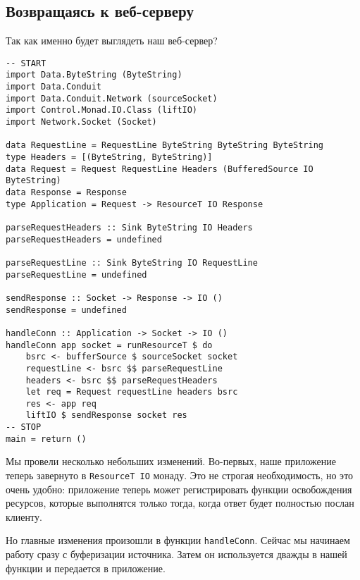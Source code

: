 \subsection{Возвращаясь к веб-серверу}
Так как именно будет выглядеть наш веб-сервер?
\begin{lstlisting}
-- START
import Data.ByteString (ByteString)
import Data.Conduit
import Data.Conduit.Network (sourceSocket)
import Control.Monad.IO.Class (liftIO)
import Network.Socket (Socket)

data RequestLine = RequestLine ByteString ByteString ByteString
type Headers = [(ByteString, ByteString)]
data Request = Request RequestLine Headers (BufferedSource IO ByteString)
data Response = Response
type Application = Request -> ResourceT IO Response

parseRequestHeaders :: Sink ByteString IO Headers
parseRequestHeaders = undefined

parseRequestLine :: Sink ByteString IO RequestLine
parseRequestLine = undefined

sendResponse :: Socket -> Response -> IO ()
sendResponse = undefined

handleConn :: Application -> Socket -> IO ()
handleConn app socket = runResourceT $ do
    bsrc <- bufferSource $ sourceSocket socket
    requestLine <- bsrc $$ parseRequestLine
    headers <- bsrc $$ parseRequestHeaders
    let req = Request requestLine headers bsrc
    res <- app req
    liftIO $ sendResponse socket res
-- STOP
main = return ()
\end{lstlisting}
Мы провели несколько небольших изменений. Во-первых, наше приложение теперь завернуто в 
\lstinline=ResourceT IO= монаду. Это не строгая необходимость, но это очень удобно:
приложение теперь может регистрировать функции освобождения ресурсов, которые выполнятся только тогда, когда ответ будет полностью послан клиенту.

Но главные изменения произошли в функции \lstinline=handleConn=. Сейчас мы начинаем работу
сразу с буферизации источника. Затем он используется дважды в нашей функции и передается в
приложение.

